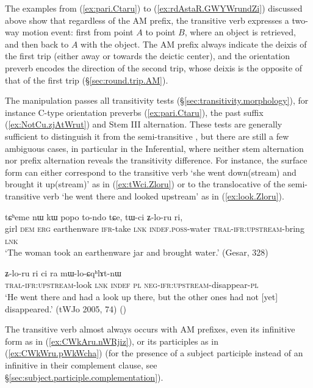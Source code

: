 The examples from (\ref{ex:pari.Ctaru}) to (\ref{ex:rdAstaR.GWYWrundZi}) discussed above show that regardless of the AM prefix, the transitive verb  expresses a two-way motion event: first from point $A$ to point $B$, where an object is retrieved, and then back to $A$ with the object.  The AM prefix always indicate the deixis of the first trip (either away or towards the deictic center), and the orientation preverb encodes the direction of the second trip, whose deixis is the opposite of that of the first trip (§\ref{sec:round.trip.AM}).

The manipulation  passes all transitivity tests (§\ref{sec:transitivity.morphology}), for instance C-type orientation preverbs (\ref{ex:pari.Ctaru}), the past suffix  (\ref{ex:NotCu.zjAtWrut}) and Stem III alternation. These tests are generally sufficient to distinguish it from the semi-transitive , but there are still a few ambiguous cases, in particular in the Inferential, where neither stem alternation nor prefix alternation reveals the transitivity difference. For instance, the surface form  can either correspond to the transitive verb `she went down(stream) and brought it up(stream)' as in (\ref{ex:tWci.Zloru}) or to the translocative of the semi-transitive verb `he went there and looked upstream' as in (\ref{ex:look.Zloru}).

\begin{exe}
\ex \label{ex:tWci.Zloru}
\gll tɕʰeme nɯ kɯ popo to-ndo tɕe, tɯ-ci ʑ-lo-ru ri, \\
girl \textsc{dem} \textsc{erg} earthenware \textsc{ifr}-take \textsc{lnk} \textsc{indef}.\textsc{poss}-water \textsc{tral}-\textsc{ifr}:\textsc{upstream}-bring \textsc{lnk} \\
\glt `The woman took an earthenware jar and brought water.' (Gesar, 328)
\end{exe}

\begin{exe}
\ex \label{ex:look.Zloru}
\gll  ʑ-lo-ru ri ci ra mɯ-lo-ɕqʰlɤt-nɯ\\
\textsc{tral}-\textsc{ifr}:\textsc{upstream}-look \textsc{lnk} \textsc{indef} \textsc{pl} \textsc{neg}-\textsc{ifr}:\textsc{upstream}-disappear-\textsc{pl}\\
\glt `He went there and had a look up there, but the other ones had not [yet] disappeared.' (tWJo 2005, 74) ()
\end{exe}

The transitive verb  almost always occurs with AM prefixes, even its infinitive form  as in (\ref{ex:CWkAru.nWRjiz}), or its participles as in (\ref{ex:CWkWru.pWkWcha}) (for the presence of a subject participle instead of an infinitive in their complement clause, see §\ref{sec:subject.participle.complementation}).

